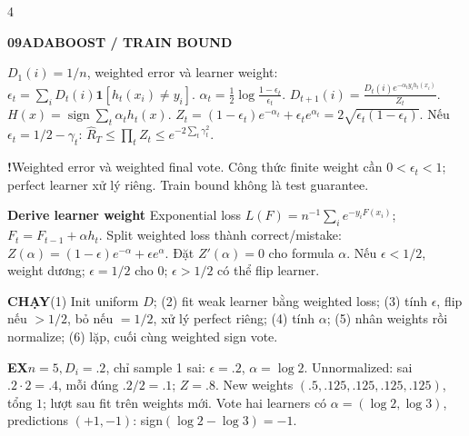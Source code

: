 \documentclass[a4paper]{article}
\newcommand{\topic}[2]{\par\addvspace{.8pt}%
  \begingroup\setlength{\fboxsep}{0.5pt}%
  \noindent\colorbox{structure}{\parbox{\dimexpr\linewidth-2\fboxsep\relax}{%
    \color{white}\fontsize{6.5}{7.1}\selectfont\bfseries #1\enspace #2}}%
  \endgroup\par\nobreak\vspace{.3pt}\nobreak}
\newcommand{\run}[1]{\key{CHẠY}#1}
\newcommand{\key}[1]{\par\textcolor{structure}{\textbf{#1}}\enspace}
\newcommand{\note}[4]{\par\begingroup\setlength{\fboxsep}{0.15pt}%
  \noindent\colorbox{#1}{\parbox{\dimexpr\linewidth-2\fboxsep\relax}{%
    \RaggedRight\textcolor{#2}{\textbf{#3}}\enspace #4}}%
  \endgroup\par}
\newcommand{\trap}[1]{\note{warningbg}{warning}{!}{#1}}
\newcommand{\ex}[1]{\note{examplebg}{example}{EX}{#1}}
\newcommand{\ind}{\mathbf1}
\begin{document}
\begin{multicols*}{4}
\topic{09}{ADABOOST / TRAIN BOUND}
$D_1(i)=1/n$, weighted error và learner weight:
$\epsilon_t=\sum_iD_t(i)\ind[h_t(x_i)\ne y_i].$
$\alpha_t=\tfrac12\log\frac{1-\epsilon_t}{\epsilon_t}.$
$D_{t+1}(i)=\frac{D_t(i)e^{-\alpha_ty_ih_t(x_i)}}{Z_t}.$
$H(x)=\operatorname{sign}\sum_t\alpha_th_t(x).$
$Z_t=(1-\epsilon_t)e^{-\alpha_t}+\epsilon_te^{\alpha_t}
=2\sqrt{\epsilon_t(1-\epsilon_t)}$.
Nếu $\epsilon_t=1/2-\gamma_t$:
$\widehat R_T\le\prod_tZ_t\le e^{-2\sum_t\gamma_t^2}.$

\trap{Weighted error và weighted final vote. Công thức finite weight cần $0<\epsilon_t<1$; perfect learner xử lý riêng. Train bound không là test guarantee.}
\key{Derive learner weight}
Exponential loss $L(F)=n^{-1}\sum_i e^{-y_iF(x_i)}$; $F_t=F_{t-1}+\alpha h_t$. Split weighted loss thành correct/mistake:
$Z(\alpha)=(1-\epsilon)e^{-\alpha}+\epsilon e^\alpha.$
Đặt $Z'(\alpha)=0$ cho formula $\alpha$. Nếu $\epsilon<1/2$, weight dương; $\epsilon=1/2$ cho $0$; $\epsilon>1/2$ có thể flip learner.
\run{(1) Init uniform $D$; (2) fit weak learner bằng weighted loss; (3) tính $\epsilon$, flip nếu $>1/2$, bỏ nếu $=1/2$, xử lý perfect riêng; (4) tính $\alpha$; (5) nhân weights rồi normalize; (6) lặp, cuối cùng weighted sign vote.}
\ex{$n=5,D_i=.2$, chỉ sample 1 sai: $\epsilon=.2$, $\alpha=\log2$. Unnormalized: sai $.2\cdot2=.4$, mỗi đúng $.2/2=.1$; $Z=.8$. New weights $(.5,.125,.125,.125,.125)$, tổng $1$; lượt sau fit trên weights mới. Vote hai learners có $\alpha=(\log2,\log3)$, predictions $(+1,-1)$: sign$(\log2-\log3)=-1$.}


\end{multicols*}
\end{document}
